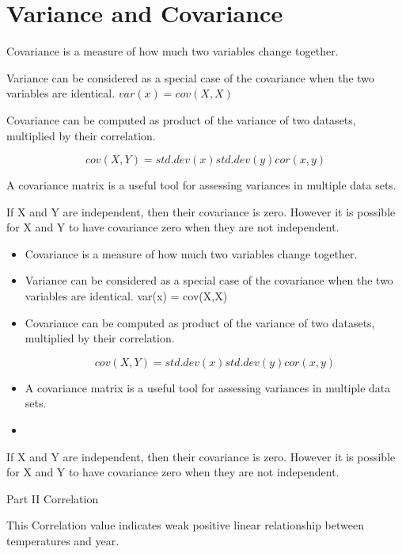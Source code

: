 \section{Variance and Covariance}
Covariance is a measure of how much two variables change together. 

Variance can be considered as a special case of the covariance when the two variables are identical.
$var(x) = cov(X,X)$

Covariance can be computed as product of the variance of two datasets, multiplied by their correlation.

\[
cov(X,Y) = std.dev (x) std.dev(y) cor(x,y)
\]

A covariance matrix is a useful tool for assessing variances in multiple data sets.


If X and Y are independent, then their covariance is zero. However it is possible for X and Y to have covariance zero when they are not independent.


\begin{itemize}
	\item Covariance is a measure of how much two variables change together. 
	
	\item	Variance can be considered as a special case of the covariance when the two variables are identical. 
	var(x) = cov(X,X)
	
	\item Covariance can be computed as product of the variance of two datasets, multiplied by their correlation.
	
	\[cov(X,Y) = std.dev (x) std.dev(y) cor(x,y)\]
	
	
	\item	A covariance matrix is a useful tool for assessing variances in multiple data sets.
	\item 
\end{itemize}




If X and Y are independent, then their covariance is zero. However it is possible for X and Y to have covariance zero when they are not independent.








Part II 	Correlation


This Correlation value indicates weak positive linear relationship between temperatures and year.
